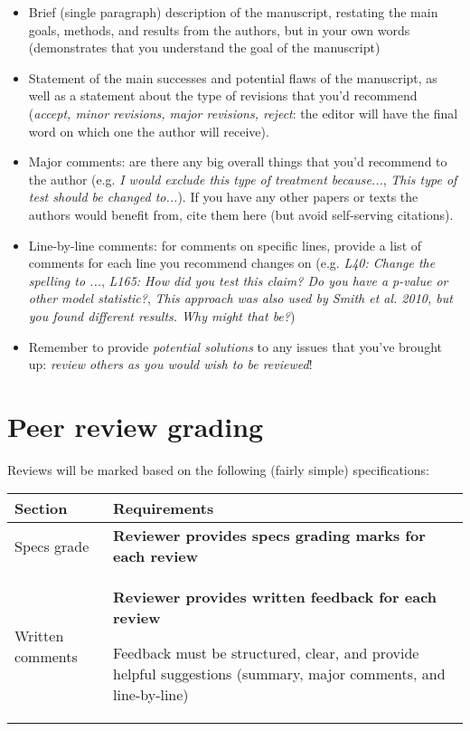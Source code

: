 \documentclass[11pt]{article}
\newcommand{\tabit}{\scriptsize\par\textbullet\phantom{ }}
\begin{document}
\begin{itemize}
  \item Brief (single paragraph) description of the manuscript, restating the main goals, methods, and results from the authors, but in your own words (demonstrates that you understand the goal of the manuscript)
  \item Statement of the main successes and potential flaws of the manuscript, as well as a statement about the type of revisions that you'd recommend (\emph{accept, minor revisions, major revisions, reject}: the editor will have the final word on which one the author will receive).
  \item Major comments: are there any big overall things that you'd recommend to the author (e.g. \emph{I would exclude this type of treatment because...}, \emph{This type of test should be changed to...}). If you have any other papers or texts the authors would benefit from, cite them here (but avoid self-serving citations).
  \item Line-by-line comments: for comments on specific lines, provide a list of comments for each line you recommend changes on (e.g. \emph{L40: Change the spelling to ...}, \emph{L165: How did you test this claim? Do you have a p-value or other model statistic?}, \emph{This approach was also used by Smith et al. 2010, but you found different results. Why might that be?}) 
  \item Remember to provide \emph{potential solutions} to any issues that you've brought up: \emph{review others as you would wish to be reviewed}!
  
\end{itemize}

\newpage

\section*{Peer review grading}

Reviews will be marked based on the following (fairly simple) specifications:

\begin{table}[h!]
\centering
\begin{tabular}{p{3cm}|p{12cm}}
\textbf{Section} & \textbf{Requirements} \\ \hline
Specs grade & \textbf{Reviewer provides specs grading marks for each review} \\ \hline
Written comments & \textbf{Reviewer provides written feedback for each review} \tabit Feedback must be structured, clear, and provide helpful suggestions (summary, major comments, and line-by-line) \\ 
\end{tabular}
\end{table}
\end{document}
